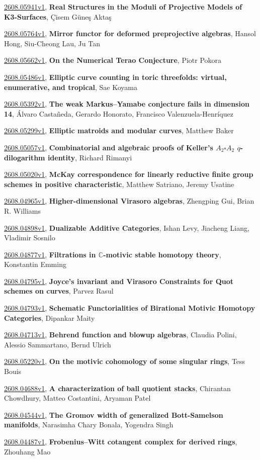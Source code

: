 \documentclass[9pt, a4paper]{article}
\theoremstyle{plain}
\theoremstyle{definition}
\theoremstyle{remark}
\newcommand{\arxiv}[3]{\href{https://arxiv.org/abs/#1}{#1}, \textbf{\textcolor{arxivblue}{#2}}, #3}
\begin{document}
\arxiv{2608.05941v1}{Real Structures in the Moduli of Projective Models of K3-Surfaces}{Çisem Güneş Aktaş}

\arxiv{2608.05764v1}{Mirror functor for deformed preprojective algebras}{Hansol Hong, Siu-Cheong Lau, Ju Tan}

\arxiv{2608.05662v1}{On the Numerical Terao Conjecture}{Piotr Pokora}

\arxiv{2608.05486v1}{Elliptic curve counting in toric threefolds: virtual, enumerative, and tropical}{Sae Koyama}

\arxiv{2608.05392v1}{The weak Markus--Yamabe conjecture fails in dimension 14}{Álvaro Castañeda, Gerardo Honorato, Francisco Valenzuela-Henríquez}

\arxiv{2608.05299v1}{Elliptic matroids and modular curves}{Matthew Baker}

\arxiv{2608.05057v1}{Combinatorial and algebraic proofs of Keller's $A_2\square A_2$ $q$-dilogarithm identity}{Richard Rimanyi}

\arxiv{2608.05020v1}{McKay correspondence for linearly reductive finite group schemes in positive characteristic}{Matthew Satriano, Jeremy Usatine}

\arxiv{2608.04965v1}{Higher-dimensional Virasoro algebras}{Zhengping Gui, Brian R. Williams}

\arxiv{2608.04898v1}{Dualizable Additive Categories}{Ishan Levy, Jiacheng Liang, Vladimir Sosnilo}

\arxiv{2608.04877v1}{Filtrations in $\mathbb{C}$-motivic stable homotopy theory}{Konstantin Emming}

\arxiv{2608.04795v1}{Joyce's invariant and Virasoro Constraints for Quot schemes on curves}{Parvez Rasul}

\arxiv{2608.04793v1}{Schematic Functorialities of Birational Motivic Homotopy Categories}{Dipankar Maity}

\arxiv{2608.04713v1}{Behrend function and blowup algebras}{Claudia Polini, Alessio Sammartano, Bernd Ulrich}

\arxiv{2608.05220v1}{On the motivic cohomology of some singular rings}{Tess Bouis}

\arxiv{2608.04688v1}{A characterization of ball quotient stacks}{Chirantan Chowdhury, Matteo Costantini, Aryaman Patel}

\arxiv{2608.04544v1}{The Gromov width of generalized Bott-Samelson manifolds}{Narasimha Chary Bonala, Yogendra Singh}

\arxiv{2608.04487v1}{Frobenius--Witt cotangent complex for derived rings}{Zhouhang Mao}
\end{document}
